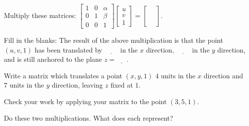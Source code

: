 \documentclass[../gatm_answers.tex]{subfiles}
\begin{document}
\begin{outer_problem}
\item 
\end{outer_problem}

\begin{inner_problem}[start=1]
\item Multiply these matrices: $\left[\begin{array}{ccc} 1 & 0 & \alpha \\ 0 & 1 & \beta \\ 0 & 0 & 1 \end{array}\right]\left[\begin{array}{c}u \\ v \\ 1 \end{array}\right]=\left[\begin{array}{c}\phantom{u} \\ \phantom{v} \\ \phantom{1}\end{array}\right].$ \label{prob:translation_matrix}
\end{inner_problem}

\begin{inner_problem}
\item Fill in the blanks: The result of the above multiplication is that the point $(u,v,1)$ has been translated by $\underline{\phantom{0000}}$ in the $x$ direction, $\underline{\phantom{0000}}$ in the $y$ direction, and is still anchored to the plane $z=\underline{\phantom{000}}$.
\end{inner_problem}

\begin{outer_problem}
\item 
\end{outer_problem}

\begin{inner_problem}[start=1]
\item Write a matrix which translates a point $(x,y,1)$ $4$ units in the $x$ direction and $7$ units in the $y$ direction, leaving $z$ fixed at $1$.
\end{inner_problem}

\begin{inner_problem}
\item Check your work by applying your matrix to the point $(3,5,1)$.
\end{inner_problem}

\begin{outer_problem}
\item Do these two multiplications. What does each represent?
\end{outer_problem}
\end{document}
